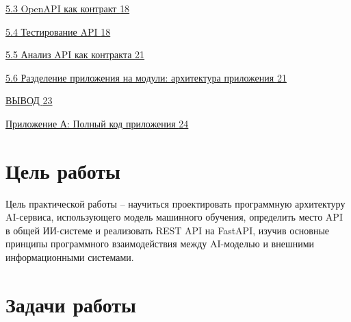\documentclass[
]{article}
\begin{document}
\hyperref[openapi-ux43aux430ux43a-ux43aux43eux43dux442ux440ux430ux43aux442]{5.3
OpenAPI как контракт
\hyperref[openapi-ux43aux430ux43a-ux43aux43eux43dux442ux440ux430ux43aux442]{18}}

\hyperref[ux442ux435ux441ux442ux438ux440ux43eux432ux430ux43dux438ux435-api]{5.4
Тестирование API
\hyperref[ux442ux435ux441ux442ux438ux440ux43eux432ux430ux43dux438ux435-api]{18}}

\hyperref[ux430ux43dux430ux43bux438ux437-api-ux43aux430ux43a-ux43aux43eux43dux442ux440ux430ux43aux442ux430]{5.5
Анализ API как контракта
\hyperref[ux430ux43dux430ux43bux438ux437-api-ux43aux430ux43a-ux43aux43eux43dux442ux440ux430ux43aux442ux430]{21}}

\hyperref[ux440ux430ux437ux434ux435ux43bux435ux43dux438ux435-ux43fux440ux438ux43bux43eux436ux435ux43dux438ux44f-ux43dux430-ux43cux43eux434ux443ux43bux438-ux430ux440ux445ux438ux442ux435ux43aux442ux443ux440ux430-ux43fux440ux438ux43bux43eux436ux435ux43dux438ux44f]{5.6
Разделение приложения на модули: архитектура приложения
\hyperref[ux440ux430ux437ux434ux435ux43bux435ux43dux438ux435-ux43fux440ux438ux43bux43eux436ux435ux43dux438ux44f-ux43dux430-ux43cux43eux434ux443ux43bux438-ux430ux440ux445ux438ux442ux435ux43aux442ux443ux440ux430-ux43fux440ux438ux43bux43eux436ux435ux43dux438ux44f]{21}}

\hyperref[ux432ux44bux432ux43eux434]{ВЫВОД
\hyperref[ux432ux44bux432ux43eux434]{23}}

\hyperref[ux43fux440ux438ux43bux43eux436ux435ux43dux438ux435-ux430-ux43fux43eux43bux43dux44bux439-ux43aux43eux434-ux43fux440ux438ux43bux43eux436ux435ux43dux438ux44f]{Приложение
А: Полный код приложения
\hyperref[ux43fux440ux438ux43bux43eux436ux435ux43dux438ux435-ux430-ux43fux43eux43bux43dux44bux439-ux43aux43eux434-ux43fux440ux438ux43bux43eux436ux435ux43dux438ux44f]{24}}

\section{Цель
работы}\label{ux446ux435ux43bux44c-ux440ux430ux431ux43eux442ux44b}

Цель практической работы -- научиться проектировать программную
архитектуру AI-сервиса, использующего модель машинного обучения,
определить место API в общей ИИ-системе и реализовать REST API на
FastAPI, изучив основные принципы программного взаимодействия между
AI-моделью и внешними информационными системами.

\section{Задачи
работы}\label{ux437ux430ux434ux430ux447ux438-ux440ux430ux431ux43eux442ux44b}
\end{document}
